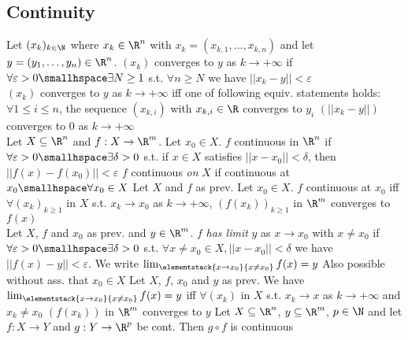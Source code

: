 \subsection{Continuity}
 Let $(x_k)_{k \in \N}$ where $x_k \in \R^n$ with $x_k = (x_{k, 1}, \ldots, x_{k, n})$ and let $y = (y_1, \ldots, y_n) \in \R^n$.
$(x_k)$ converges to $y$ as $k \rightarrow +\infty$ if $\forall \varepsilon > 0 \smallhspace \exists N \geq 1$ s.t. $\forall n \geq N$ we have $||x_k - y|| < \varepsilon$\\
\shortlemma $(x_k)$ converges to $y$ as $k \rightarrow +\infty$ iff one of following equiv. statements holds:
 $\forall 1 \leq i \leq n$, the sequence $(x_{k, i})$ with $x_{k, i} \in \R$ converges to $y_i$
 $(||x_k - y||)$ converges to $0$ as $k \rightarrow +\infty$\\
 Let $X \subseteq \R^n$ and $f: X \rightarrow \R^m$.
 Let $x_0 \in X$. $f$ continuous in $\R^n$ if $\forall \varepsilon > 0 \smallhspace \exists \delta > 0$ s.t. if $x \in X$ satisfies $||x - x_0|| < \delta$,
then $||f(x) - f(x_0)|| < \varepsilon$
 $f$ continuous \textit{on} $X$ if continuous at $x_0 \smallhspace \forall x_0 \in X$
\shortproposition Let $X$ and $f$ as prev. Let $x_0 \in X$. $f$ continuous at $x_0$ iff $\forall (x_k)_{k \geq 1}$ in $X$ s.t.
$x_k \rightarrow x_0$ as $k \rightarrow +\infty$, $(f(x_k))_{k \geq 1}$ in $\R^m$ converges to $f(x)$\\
 Let $X$, $f$ and $x_0$ as prev. and $y \in \R^m$. $f$ \textit{has limit} $y$ as $x \rightarrow x_0$ with $x \neq x_0$ if
$\forall \varepsilon > 0 \smallhspace \exists \delta > 0$ s.t. $\forall x \neq x_0 \in X, ||x - x_0|| < \delta$ we have $||f(x) - y|| < \varepsilon$.
We write $\lim_{\elementstack{x \rightarrow x_0}{x \neq x_0}} f(x) = y$
\shortremark Also possible without ass. that $x_0 \in X$
\shortproposition Let $X$, $f$, $x_0$ and $y$ as prev. We have $\lim_{\elementstack{x \rightarrow x_0}{x \neq x_0}} f(x) = y$
iff $\forall (x_k)$ in $X$ s.t. $x_k \rightarrow x$ as $k \rightarrow +\infty$ and $x_k \neq x_0$ $(f(x_k))$ in $\R^m$ converges to $y$
\shortproposition Let $X \subseteq \R^n$, $y \subseteq \R^m$, $p \in \N$ and let $f: X \rightarrow Y$ and $g: Y \rightarrow \R^p$ be cont. Then $g \circ f$ is continuous

